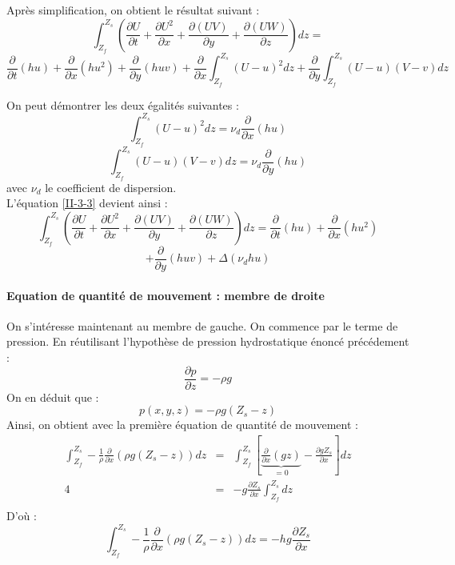 Après simplification, on obtient le résultat suivant :
\begin{equation} \label{II-3-3} 
	\int_{Z_f}^{Z_s} \left(\frac{\partial U}{\partial t} + \frac{\partial U^2}{\partial x} + \frac{\partial (UV)}{\partial y} +\frac{\partial (UW)}{\partial z}\right) dz = 
\end{equation}
	\[\frac{\partial}{\partial t} (hu) + \frac{\partial}{\partial x}(hu^2)+\frac{\partial}{\partial y}(huv) + \frac{\partial}{\partial x} \int_{Z_f}^{Z_s} (U-u)^2 dz + \frac{\partial}{\partial y} \int_{Z_f}^{Z_s} (U-u)(V-v) dz\]

On peut démontrer les deux égalités suivantes :
\[\int_{Z_f}^{Z_s} (U-u)^2 dz=\nu_d\frac{\partial}{\partial x}(hu)\]
\[\int_{Z_f}^{Z_s} (U-u)(V-v) dz=\nu_d \frac{\partial}{\partial y} (hu)\]
avec $\nu_d$ le coefficient de dispersion.\\
L'équation \ref{II-3-3} devient ainsi :
\begin{equation} \label{II-3-4}
	\int_{Z_f}^{Z_s} \left(\frac{\partial U}{\partial t} + \frac{\partial U^2}{\partial x} + \frac{\partial (UV)}{\partial y} +\frac{\partial (UW)}{\partial z}\right) dz =\frac{\partial}{\partial t} (hu) + \frac{\partial}{\partial x}(hu^2)
\end{equation}
\[+\frac{\partial}{\partial y}(huv)+\Delta(\nu_dhu)\]

\paragraph{Equation de quantité de mouvement : membre de droite}
On s'intéresse maintenant au membre de gauche. On commence par le terme de pression. En réutilisant l'hypothèse de pression hydrostatique énoncé précédement :
	\[\frac{\partial p}{\partial z}=-\rho g\]
On en déduit que :
	\[p(x,y,z)=-\rho g(Z_s-z)\]
Ainsi, on obtient avec la première équation de quantité de mouvement :
\begin{eqnarray*}
	\int_{Z_f}^{Z_s} -\frac{1}{\rho} \frac{\partial}{\partial x} (\rho g(Z_s-z)) dz &=& \int_{Z_f}^{Z_s} \left[ \underbrace{\frac{\partial}{\partial x} (gz)}_{=0}-\frac{\partial gZ_s}{\partial x} \right] dz \\
4							       &=& -g \frac{\partial Z_s}{\partial x} \int_{Z_f}^{Z_s} dz \\
\end{eqnarray*}
D'où :
\begin{equation} \label{II-2-5} \int_{Z_f}^{Z_s} -\frac{1}{\rho} \frac{\partial}{\partial x} (\rho g(Z_s-z)) dz= -hg\frac{\partial Z_s}{\partial x} \end{equation}

